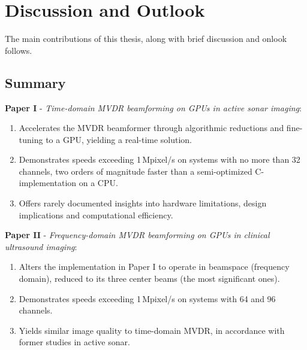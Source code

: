 
\endofdump

\ifRootBuild\else
  
  \makeglossaries
\fi



\chapter{Discussion and Outlook}

The main contributions of this thesis, along with brief discussion and onlook follows.

\section{Summary}

\textbf{Paper I} - \textit{Time-domain MVDR beamforming on GPUs in active sonar imaging}:
\begin{enumerate}
\item Accelerates the MVDR beamformer through algorithmic reductions and fine-tuning to a GPU, yielding a real-time solution.
\item Demonstrates speeds exceeding 1\,Mpixel/s on systems with no more than 32 channels, two orders of magnitude faster than a semi-optimized C-implementation on a CPU.
\item Offers rarely documented insights into hardware limitations, design implications and computational efficiency.
\end{enumerate}

\textbf{Paper II} - \textit{Frequency-domain MVDR beamforming on GPUs in clinical ultrasound imaging}:
\begin{enumerate}
\item Alters the implementation in Paper I to operate in beamspace (frequency domain), reduced to its three center beams (the most significant ones).
\item Demonstrates speeds exceeding 1\,Mpixel/s on systems with 64 and 96 channels.
\item Yields similar image quality to time-domain MVDR, in accordance with former studies in active sonar.
\end{enumerate}

